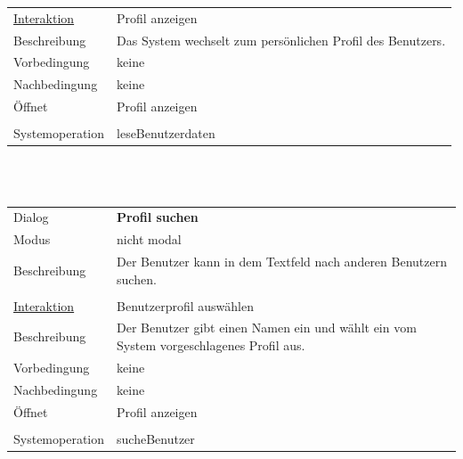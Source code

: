 \documentclass[12pt,a4paper]{article}
\begin{document}
{\begin{tabular}{l p{12cm}}
\underline{Interaktion} 	 & Profil anzeigen\\ 
Beschreibung   	 & Das System wechselt zum persönlichen Profil des Benutzers.\\
Vorbedingung	& keine \\
Nachbedingung	& keine \\
Öffnet			& \glqq Profil anzeigen\grqq \\\\
Systemoperation & leseBenutzerdaten\\
\end{tabular}\\\\

\begin{tabular}{l p{12cm}}
Dialog 	 & \textbf{Profil suchen} \\ 
Modus & nicht modal\\ 
Beschreibung   	 & Der Benutzer kann in dem Textfeld nach anderen Benutzern suchen.\\\\

\underline{Interaktion} 	 & Benutzerprofil auswählen\\ 
Beschreibung   	 & Der Benutzer gibt einen Namen ein und wählt ein vom System vorgeschlagenes Profil aus.\\
Vorbedingung	& keine \\
Nachbedingung	& keine \\
Öffnet			& \glqq Profil anzeigen\grqq \\\\
Systemoperation & sucheBenutzer\\
\end{tabular}\\\\


\begin{figure}[H]
	\centering

\end{figure}}
\end{document}
